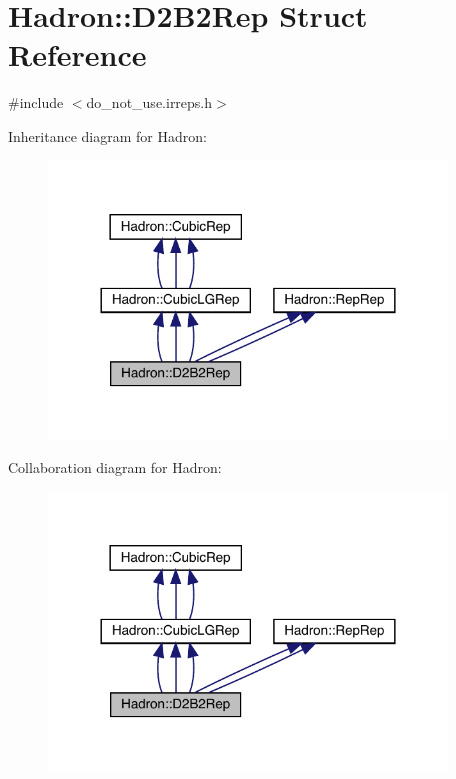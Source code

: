 \hypertarget{structHadron_1_1D2B2Rep}{}\section{Hadron\+:\+:D2\+B2\+Rep Struct Reference}
\label{structHadron_1_1D2B2Rep}


{\ttfamily \#include $<$do\+\_\+not\+\_\+use.\+irreps.\+h$>$}



Inheritance diagram for Hadron\+:
\nopagebreak
\begin{figure}[H]
\begin{center}
\leavevmode
\includegraphics[width=300pt]{d3/d59/structHadron_1_1D2B2Rep__inherit__graph}
\end{center}
\end{figure}


Collaboration diagram for Hadron\+:
\nopagebreak
\begin{figure}[H]
\begin{center}
\leavevmode
\includegraphics[width=300pt]{d9/df8/structHadron_1_1D2B2Rep__coll__graph}
\end{center}
\end{figure}

